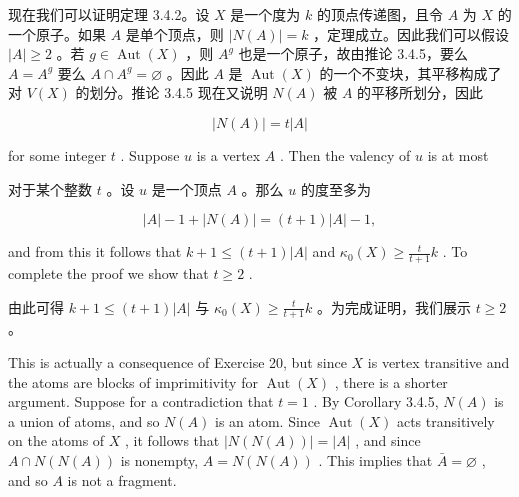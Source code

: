 \documentclass[10pt]{article}
\begin{document}
\begin{tcolorbox}\relax
现在我们可以证明定理 3.4.2。设 \(X\) 是一个度为 \(k\) 的顶点传递图，且令 \(A\) 为 \(X\) 的一个原子。如果 \(A\) 是单个顶点，则 \(\left| {N\left( A\right) }\right|  = k\) ，定理成立。因此我们可以假设 \(\left| A\right|  \geq  2\) 。若 \(g \in  \operatorname{Aut}\left( X\right)\) ，则 \({A}^{g}\) 也是一个原子，故由推论 3.4.5，要么 \(A = {A}^{g}\) 要么 \(A \cap  {A}^{g} = \varnothing\) 。因此 \(A\) 是 \(\operatorname{Aut}\left( X\right)\) 的一个不变块，其平移构成了对 \(V\left( X\right)\) 的划分。推论 3.4.5 现在又说明 \(N\left( A\right)\) 被 \(A\) 的平移所划分，因此
\end{tcolorbox}

\[
\left| {N\left( A\right) }\right|  = t\left| A\right|
\]

for some integer \(t\) . Suppose \(u\) is a vertex \(A\) . Then the valency of \(u\) is at most

\begin{tcolorbox}\relax
对于某个整数 \(t\) 。设 \(u\) 是一个顶点 \(A\) 。那么 \(u\) 的度至多为
\end{tcolorbox}

\[
\left| A\right|  - 1 + \left| {N\left( A\right) }\right|  = \left( {t + 1}\right) \left| A\right|  - 1,
\]

and from this it follows that \(k + 1 \leq  \left( {t + 1}\right) \left| A\right|\) and \({\kappa }_{0}\left( X\right)  \geq  \frac{t}{t + 1}k\) . To complete the proof we show that \(t \geq  2\) .

\begin{tcolorbox}\relax
由此可得 \(k + 1 \leq  \left( {t + 1}\right) \left| A\right|\) 与 \({\kappa }_{0}\left( X\right)  \geq  \frac{t}{t + 1}k\) 。为完成证明，我们展示 \(t \geq  2\) 。
\end{tcolorbox}

This is actually a consequence of Exercise 20, but since \(X\) is vertex transitive and the atoms are blocks of imprimitivity for \(\operatorname{Aut}\left( X\right)\) , there is a shorter argument. Suppose for a contradiction that \(t = 1\) . By Corollary 3.4.5, \(N\left( A\right)\) is a union of atoms, and so \(N\left( A\right)\) is an atom. Since \(\operatorname{Aut}\left( X\right)\) acts transitively on the atoms of \(X\) , it follows that \(\left| {N\left( {N\left( A\right) }\right) }\right|  = \left| A\right|\) , and since \(A \cap  N\left( {N\left( A\right) }\right)\) is nonempty, \(A = N\left( {N\left( A\right) }\right)\) . This implies that \(\bar{A} = \varnothing\) , and so \(A\) is not a fragment.
\end{document}
